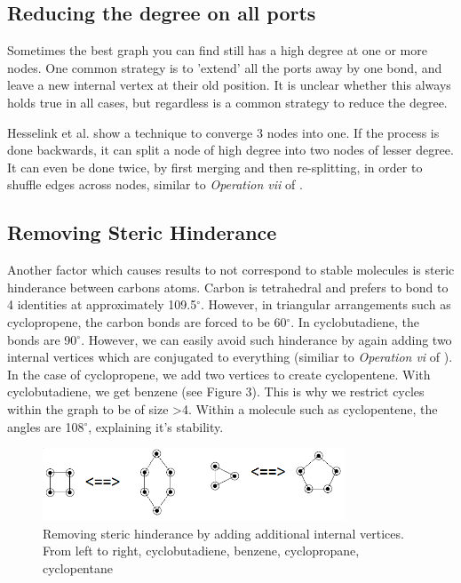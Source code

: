 \documentclass[12pt]{article}
\begin{document}
\subsection{Reducing the degree on all ports}

Sometimes the best graph you can find still has a high degree at one or more nodes. One common strategy is to 'extend' all the ports away by one bond, and leave a new internal vertex at their old position. It is unclear whether this always holds true in all cases, but regardless is a common strategy to reduce the degree. 

Hesselink et al. \cite{HH13} show a technique to converge 3 nodes into one. If the process is done backwards, it can split a node of high degree into two nodes of lesser degree. It can even be done twice, by first merging and then re-splitting, in order to shuffle edges across nodes, similar to \textit{Operation vii} of \cite{v06}. 

\subsection{Removing Steric Hinderance}

Another factor which causes results to not correspond to stable molecules is
steric hinderance between carbons atoms. Carbon is tetrahedral and prefers to bond to 4 identities at approximately 109.5$^\circ$. However, in triangular arrangements such as cyclopropene, the carbon bonds are forced to be 60$^\circ$. In cyclobutadiene, the bonds are 90$^\circ$. However, we can easily avoid such hinderance by again adding  two internal vertices which are conjugated to everything (similiar to \textit{Operation vi} of \cite{v06}). In the case of cyclopropene, we add two vertices to create cyclopentene. With cyclobutadiene, we get benzene (see Figure 3). This is why we restrict cycles within the graph to be of size \textgreater 4. Within a molecule such as cyclopentene, the angles are 108$^\circ$, explaining it's stability. 

\begin{figure}[ht!]
\centering
\includegraphics[width=90mm]{cycles.png}
\caption{ Removing steric hinderance by adding additional internal vertices. From left to right, cyclobutadiene, benzene, cyclopropane, cyclopentane}
\end{figure}
\end{document}
